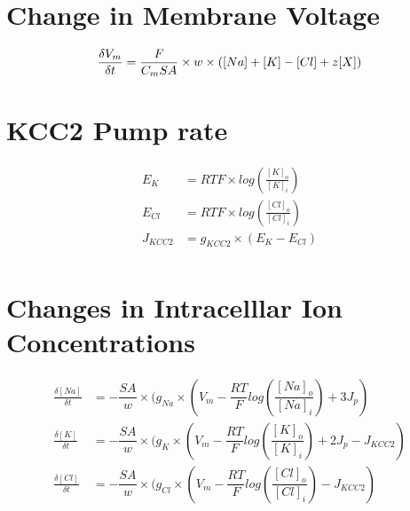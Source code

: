 \documentclass{article}
\begin{document}
\section{Change in Membrane Voltage}
\setlength{\jot}{10pt}
\begin{equation}
\frac{\delta V_{m}}{\delta t}= \frac{F}{C_{m} SA} \times w \times ([Na] + [K] - [Cl] + z[X]) \\
\end{equation}

\section{KCC2 Pump rate}
\setlength{\jot}{10pt}
\begin{align}
E_{K} &= RTF \times log(\frac{[K]_{o}}{[K]_{i}})\\
E_{Cl} &= RTF \times log(\frac{[Cl]_{o}}{[Cl]_{i}})\\
J_{KCC2} &= g_{KCC2}\times(E_{K}-E_{Cl})\\
\nonumber
\end{align}


\section{Changes in Intracelllar Ion Concentrations}
\setlength{\jot}{10pt}
\begin{align}
\frac{\delta [Na]}{\delta t}&= -\dfrac{SA}{w}\times(g_{Na} \times(V_{m} - \dfrac{RT}{F} log(\dfrac{[Na]_{o}}{[Na]_{i}}) + 3J_{p}) \\
\frac{\delta [K]}{\delta t}&= -\dfrac{SA}{w} \times (g_{K} \times (V_{m} - \dfrac{RT}{F} log(\dfrac{[K]_{o}}{[K]_{i}}) + 2J_{p} - J_{KCC2}) \\
\frac{\delta [Cl]}{\delta t}&= -\dfrac{SA}{w} \times  (g_{Cl} \times(V_{m} - \dfrac{RT}{F} log(\dfrac{[Cl]_{o}}{[Cl]_{i}}) - J_{KCC2}) \\
\nonumber
\end{align}
\end{document}
